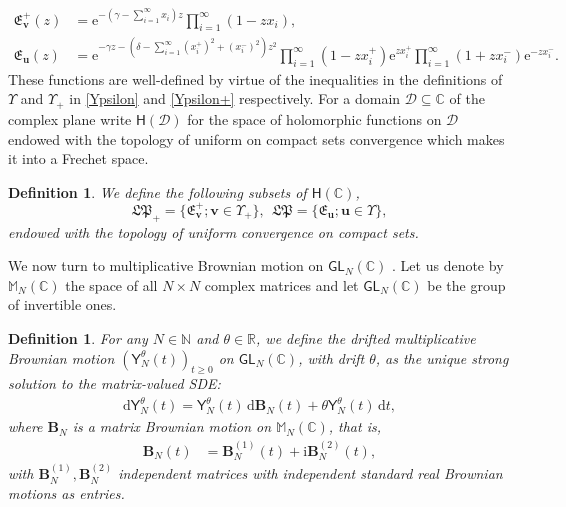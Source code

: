 \documentclass[]{article}
\newtheorem{defn}[thm]{Definition}
\begin{document}
\begin{align*}
\mathfrak{E}_{\boldsymbol{v}}^+(z)&=\mathrm{e}^{-(\gamma-\sum_{i=1}^\infty x_i)z}\prod_{i=1}^\infty \left(1-zx_i\right), \\
\mathfrak{E}_{\boldsymbol{u}}(z) &=\mathrm{e}^{-\gamma z-(\delta-\sum_{i=1}^\infty (x_i^+)^2+(x_i^-)^2)z^2}\prod_{i=1}^\infty(1-zx_i^+)\mathrm{e}^{zx_i^+}\prod_{i=1}^\infty(1+zx_i^-)\mathrm{e}^{-zx_i^-}.
\end{align*}
These functions are well-defined by virtue of the inequalities in the definitions of $\Upsilon$ and $\Upsilon_+$ in \eqref{Ypsilon} and \eqref{Ypsilon+} respectively. For a domain $\mathscr{D}\subseteq \mathbb{C}$  of the complex plane write $\mathsf{H}(\mathscr{D})$ for the space of holomorphic functions on $\mathscr{D}$ endowed with the topology of uniform on compact sets convergence which makes it into a Frechet space.

\begin{defn} We define the following subsets of $\mathsf{H}(\mathbb{C})$,
\begin{equation*}
\mathfrak{LP}_+=\{\mathfrak{E}^+_{\boldsymbol{v}};\boldsymbol{v}\in \Upsilon_+\}, \ \ \mathfrak{LP}=\{\mathfrak{E}_{\boldsymbol{u}};\boldsymbol{u}\in \Upsilon\},
\end{equation*}
endowed with the topology of uniform convergence on compact sets.
\end{defn}

We now turn to multiplicative Brownian motion on $\mathsf{GL}_N(\mathbb{C})$ \cite{NorrisRogersWilliams,Biane,JonesOConnell,BianeMatrixValuedBM, IpsenSchomerus,KempGLN,BCKP,AhnVanPeski}. Let us denote by $\mathbb{M}_N(\mathbb{C})$ the space of all $N\times N$ complex matrices and let $\mathsf{GL}_N(\mathbb{C})$
be the group of invertible ones.

\begin{defn}
For any $N\in\mathbb{N}$ and 
$\theta\in\mathbb{R}$, we define the drifted  multiplicative Brownian motion 
$(\mathsf{Y}_N^\theta(t))_{t\ge0}$ on $\mathsf{GL}_N(\mathbb{C})$, with drift $\theta$, as the unique strong solution to the matrix-valued SDE:
\begin{align}\label{thetaBMonGL}
\mathrm{d} \mathsf{Y}_N^\theta(t) = \mathsf{Y}_N^\theta(t)\, \mathrm{d} \boldsymbol{B}_N(t) + \theta \mathsf{Y}_N^\theta(t) \, \mathrm{d} t,
\end{align}
where
$\boldsymbol{B}_N$ is a matrix Brownian motion on $\mathbb{M}_N(\mathbb{C})$, that is,
\begin{align*}
\boldsymbol{B}_N(t) &=  \boldsymbol{B}_N^{(1)}(t) + \mathrm{i} \boldsymbol{B}_N^{(2)}(t),
\end{align*}
with $\boldsymbol{B}_N^{(1)},\boldsymbol{B}_N^{(2)}$ independent matrices with independent standard real Brownian motions as entries. 
   \end{defn}
\end{document}
